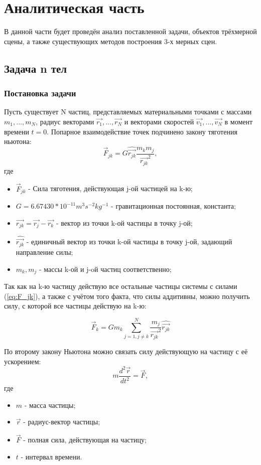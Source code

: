 \chapter{Аналитическая часть}

В данной части будет проведён анализ поставленной задачи, объектов трёхмерной сцены, а также существующих методов построения 3-х мерных сцен.

\section{Задача n тел}
\subsection{Постановка задачи}
Пусть существует N частиц, представляемых материальными точками с массами $m_1, ..., m_N$, радиус векторами $\vec{r_1}, ..., \vec{r_N}$ и векторами скоростей $\vec{v_1}, ..., \vec{v_N}$ в момент времени $t=0$.
Попарное взаимодействие точек подчинено закону тяготения ньютона:
\begin{equation}
	\label{eq:F_jk}
	\vec{F}_{jk} = G\hat{\vec{r_{jk}}}\frac{m_km_j}{\vec{r_{jk}}^2},
\end{equation}
где
\begin{itemize}
	\item $\vec{F}_{jk}$ - Сила тяготения, действующая j-ой частицей на k-ю;
	\item $G = 6.67430 * 10^{-11} m^3s^{-2}kg^{-1}$ - гравитационная постоянная, константа;
	\item $\vec{r_{jk}} = \vec{r_j} - \vec{r_k}$ - вектор из точки k-ой частицы в точку j-ой;
	\item $\hat{\vec{r_{jk}}}$ - единичный вектор из точки k-ой частицы в точку j-ой, задающий направление силы;
	\item $m_k, m_j$ - массы k-ой и j-oй частиц соответственно;
\end{itemize}

Так как на k-ю частицу действую все остальные частицы системы с силами (\ref{eq:F_jk}), а также с учётом того факта, что силы аддитивны, можно получить силу, с которой все частицы действую на k-ю:

\begin{equation}
	\label{eq:F_sumk}
	\vec{F}_{k} = Gm_k\sum_{j=1, j \neq k}^{N}{\frac{m_j}{\vec{r_{jk}}^2}\hat{\vec{r_{jk}}}}
\end{equation}

По второму закону Ньютона можно связать силу действующую на частицу с её ускорением:
\begin{equation}
	\label{eq:newton2}
	m\frac{d^2\vec{r}}{dt^2} = \vec{F},
\end{equation}
где
\begin{itemize}
	\item $m$ - масса частицы;
	\item $\vec{r}$ - радиус-вектор частицы;
	\item $\vec{F}$ - полная сила, действующая на частицу;
	\item $t$ - интервал времени.
\end{itemize}

